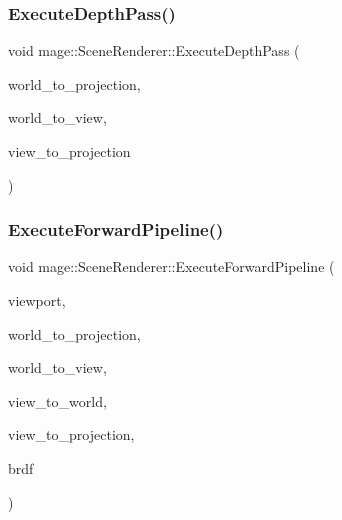 \hypertarget{classmage_1_1_scene_renderer_a860ba5904dcd5e7a71d0b66783728c4a}{}\label{classmage_1_1_scene_renderer_a860ba5904dcd5e7a71d0b66783728c4a} 
\subsubsection{\texorpdfstring{Execute\+Depth\+Pass()}{ExecuteDepthPass()}}
{\footnotesize\ttfamily void mage\+::\+Scene\+Renderer\+::\+Execute\+Depth\+Pass (\begin{DoxyParamCaption}\item[{F\+X\+M\+M\+A\+T\+R\+IX}]{world\+\_\+to\+\_\+projection,  }\item[{C\+X\+M\+M\+A\+T\+R\+IX}]{world\+\_\+to\+\_\+view,  }\item[{C\+X\+M\+M\+A\+T\+R\+IX}]{view\+\_\+to\+\_\+projection }\end{DoxyParamCaption})\hspace{0.3cm}{\ttfamily [private]}}

\hypertarget{classmage_1_1_scene_renderer_a54ce5ee2e29c806d8aaf449fb0ca560e}{}\label{classmage_1_1_scene_renderer_a54ce5ee2e29c806d8aaf449fb0ca560e} 
\subsubsection{\texorpdfstring{Execute\+Forward\+Pipeline()}{ExecuteForwardPipeline()}}
{\footnotesize\ttfamily void mage\+::\+Scene\+Renderer\+::\+Execute\+Forward\+Pipeline (\begin{DoxyParamCaption}\item[{const \hyperlink{structmage_1_1_viewport}{Viewport} \&}]{viewport,  }\item[{F\+X\+M\+M\+A\+T\+R\+IX}]{world\+\_\+to\+\_\+projection,  }\item[{C\+X\+M\+M\+A\+T\+R\+IX}]{world\+\_\+to\+\_\+view,  }\item[{C\+X\+M\+M\+A\+T\+R\+IX}]{view\+\_\+to\+\_\+world,  }\item[{C\+X\+M\+M\+A\+T\+R\+IX}]{view\+\_\+to\+\_\+projection,  }\item[{\hyperlink{namespacemage_ae7a7a03a7b34d7e2689689bb8295cd38}{B\+R\+D\+F\+Type}}]{brdf }\end{DoxyParamCaption})\hspace{0.3cm}{\ttfamily [private]}}

